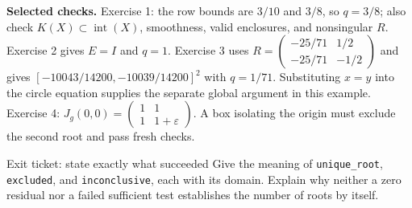\textbf{Selected checks.} Exercise 1: the row bounds are $3/10$ and
$3/8$, so $q=3/8$; also check $K(X)\subset\operatorname{int}(X)$,
smoothness, valid enclosures, and nonsingular $R$. Exercise 2 gives $E=I$
and $q=1$. Exercise 3 uses
$R=\left(\begin{smallmatrix}-25/71&1/2\\-25/71&-1/2\end{smallmatrix}\right)$
and gives $[-10043/14200,-10039/14200]^2$ with $q=1/71$.
Substituting $x=y$ into the circle equation supplies the separate global
argument in this example. Exercise 4: $J_g(0,0)=
\left(\begin{smallmatrix}1&1\\1&1+\varepsilon\end{smallmatrix}\right)$.
A box isolating the origin must exclude the second root and pass fresh checks.

\begin{question}{Exit ticket: state exactly what succeeded}
Give the meaning of \texttt{unique\_root}, \texttt{excluded}, and
\texttt{inconclusive}, each with its domain. Explain why neither a zero
residual nor a failed sufficient test establishes the number of roots by itself.
\end{question}


